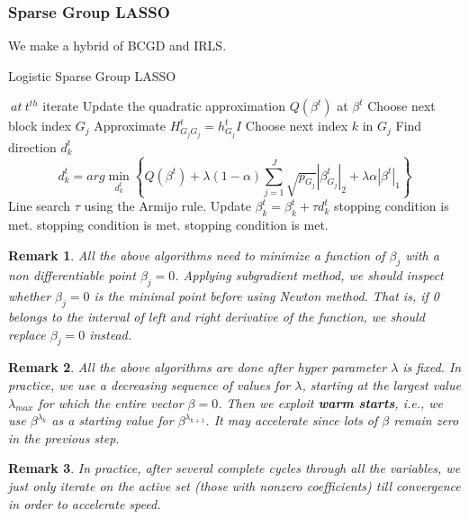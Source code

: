 \documentclass[]{article}
\newtheorem{remark}{Remark}
\begin{document}
\subsubsection{Sparse Group LASSO}
We make a hybrid of BCGD and IRLS.
\begin{algorithm}  
	\caption{Logistic Sparse Group LASSO}  
	\begin{algorithmic}[1] %
		\Repeat $\ at\ t^{th}$ iterate
		\State Update the quadratic approximation $ Q(\beta^t) $ at $\beta^t$
		\Repeat
		\State Choose next block index $ {G_j} $
		\State Approximate $H_{G_jG_j}^t=h_{G_j}^t I$
		\Repeat
		\State Choose next index $k$ in $ {G_j} $
		\State Find direction $ d_{k}^t $
		\State \begin{equation*}
		d_{k}^t=arg\min\limits_{d_{k}^t}\left\{Q(\beta^t)+\lambda (1-\alpha)\sum_{j=1}^J \sqrt{p_{G_j}}|\beta_{G_j}^t|_2+\lambda\alpha|\beta^t|_1\right\}
		\end{equation*}
		\State Line search $ \tau $ using the Armijo rule.
		\State Update $ \beta^t_{k}=\beta^t_{k}+\tau d^t_{k}$
		\Until stopping condition is met.
		\Until stopping condition is met.
		\Until stopping condition is met.
	\end{algorithmic}
\end{algorithm} 

\begin{remark}\label{1}
	All the above algorithms need to minimize a function of $ \beta_j $ with a non differentiable point $ \beta_j=0 $. Applying subgradient method, we should inspect whether $ \beta_j=0 $ is the minimal point before using Newton method. That is, if 0 belongs to the interval of left and right derivative of the function, we should replace $ \beta_j=0 $ instead.
\end{remark}
\begin{remark}\label{2}
	All the above algorithms are done after hyper parameter $\lambda$ is fixed. In practice, we use a decreasing sequence of values for $\lambda$, starting at the largest value $\lambda_{max}$ for which the entire vector $\beta=0$. Then we exploit \textbf{warm starts}\cite{friedman2010regularization}, i.e., we use $ \beta^{\lambda_k} $ as a starting value for $ \beta^{\lambda_{k+1}} $. It may accelerate since lots of $\beta$ remain zero in the previous step.
\end{remark}
\begin{remark}\label{3}
	In practice, after several complete cycles through all the variables, we just only iterate on the active set (those with nonzero coefficients) till convergence in order to accelerate speed. 
\end{remark}
\end{document}
